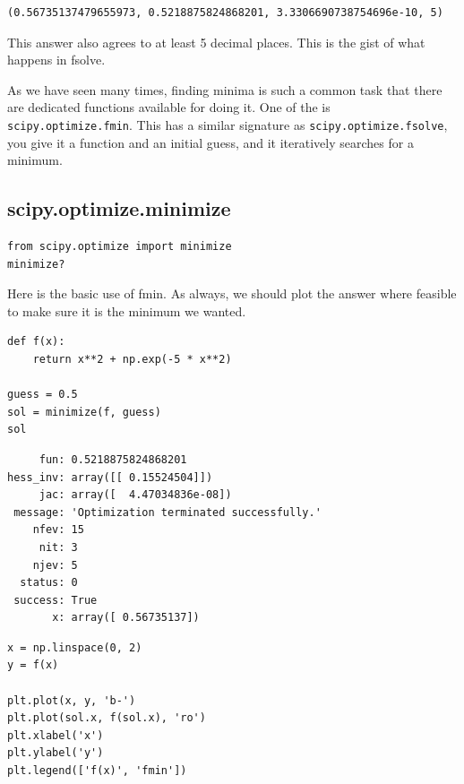 \documentclass[11pt]{article}
\begin{document}
\begin{verbatim}
(0.56735137479655973, 0.5218875824868201, 3.3306690738754696e-10, 5)
\end{verbatim}

This answer also agrees to at least 5 decimal places. This is the gist of what happens in fsolve.

As we have seen many times, finding minima is such a common task that there are dedicated functions available for doing it. One of the is \texttt{scipy.optimize.fmin}. This has a similar signature as \texttt{scipy.optimize.fsolve}, you give it a function and an initial guess, and it iteratively searches for a minimum.

\subsection{scipy.optimize.minimize}
\label{sec:org0bb73c2}

\begin{verbatim}
from scipy.optimize import minimize
minimize?
\end{verbatim}

Here is the basic use of fmin. As always, we should plot the answer where feasible to make sure it is the minimum we wanted.

\begin{verbatim}
def f(x):
    return x**2 + np.exp(-5 * x**2)

guess = 0.5
sol = minimize(f, guess)
sol
\end{verbatim}

\begin{verbatim}
     fun: 0.5218875824868201
hess_inv: array([[ 0.15524504]])
     jac: array([  4.47034836e-08])
 message: 'Optimization terminated successfully.'
    nfev: 15
     nit: 3
    njev: 5
  status: 0
 success: True
       x: array([ 0.56735137])
\end{verbatim}

\begin{verbatim}
x = np.linspace(0, 2)
y = f(x)

plt.plot(x, y, 'b-')
plt.plot(sol.x, f(sol.x), 'ro')
plt.xlabel('x')
plt.ylabel('y')
plt.legend(['f(x)', 'fmin'])
\end{verbatim}
\end{document}
